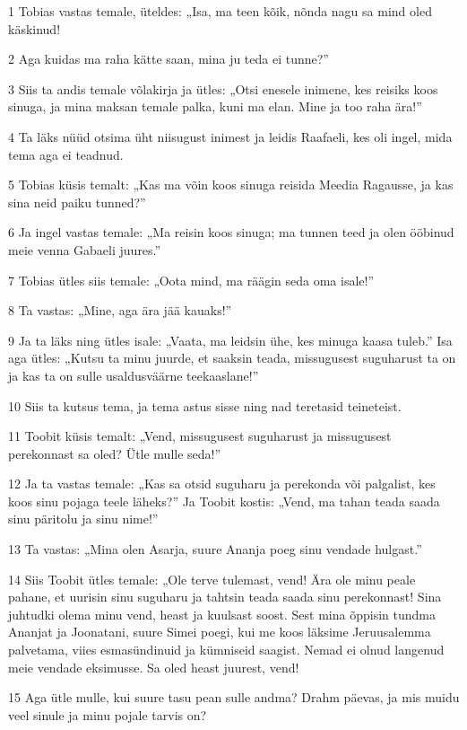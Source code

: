 \par 1 Tobias vastas temale, üteldes: „Isa, ma teen kõik, nõnda nagu  sa mind oled käskinud!
\par 2 Aga kuidas ma raha kätte saan, mina ju teda ei tunne?”
\par 3 Siis ta andis temale võlakirja ja ütles: „Otsi enesele inimene,  kes reisiks koos sinuga, ja mina maksan temale palka, kuni ma elan.  Mine ja too raha ära!”
\par 4 Ta läks nüüd otsima üht niisugust inimest ja leidis Raafaeli, kes  oli ingel, mida tema aga ei teadnud.
\par 5 Tobias küsis temalt: „Kas ma võin koos sinuga reisida Meedia  Ragausse, ja kas sina neid paiku tunned?”
\par 6 Ja ingel vastas temale: „Ma reisin koos sinuga; ma tunnen teed ja  olen ööbinud meie venna Gabaeli juures.”
\par 7 Tobias ütles siis temale: „Oota mind, ma räägin seda oma  isale!”
\par 8 Ta vastas: „Mine, aga ära jää kauaks!”
\par 9 Ja ta läks ning ütles isale: „Vaata, ma leidsin ühe, kes minuga  kaasa tuleb.” Isa aga ütles: „Kutsu ta minu juurde, et saaksin teada,  missugusest suguharust ta on ja kas ta on sulle usaldusväärne  teekaaslane!”
\par 10 Siis ta kutsus tema, ja tema astus sisse ning nad teretasid  teineteist.
\par 11 Toobit küsis temalt: „Vend, missugusest suguharust ja  missugusest perekonnast sa oled? Ütle mulle seda!”
\par 12 Ja ta vastas temale: „Kas sa otsid suguharu ja perekonda või  palgalist, kes koos sinu pojaga teele läheks?” Ja Toobit kostis:  „Vend, ma tahan teada saada sinu päritolu ja sinu nime!”
\par 13 Ta vastas: „Mina olen Asarja, suure Ananja poeg sinu vendade  hulgast.”
\par 14 Siis Toobit ütles temale: „Ole terve tulemast, vend! Ära ole  minu peale pahane, et uurisin sinu suguharu ja tahtsin teada saada  sinu perekonnast! Sina juhtudki olema minu vend, heast ja kuulsast  soost. Sest mina õppisin tundma Ananjat ja Joonatani, suure Simei  poegi, kui me koos läksime Jeruusalemma palvetama, viies  esmasündinuid ja kümniseid saagist. Nemad ei olnud langenud meie  vendade eksimusse. Sa oled heast juurest, vend!
\par 15 Aga ütle mulle, kui suure tasu pean sulle andma? Drahm päevas,  ja mis muidu veel sinule ja minu pojale tarvis on?
